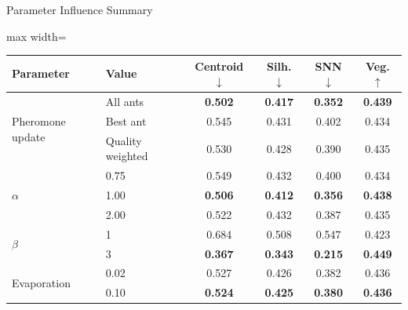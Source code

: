 \documentclass[aspectratio=169,10pt]{beamer}
\newcommand{\betterdown}{\(\downarrow\)}
\newcommand{\betterup}{\(\uparrow\)}
\begin{document}
\begin{frame}{Parameter Influence Summary}
  \begin{adjustbox}{max width=\textwidth}
  \begin{tabular}{llcccc}
    \toprule
    Parameter & Value & Centroid \betterdown & Silh. \betterdown & SNN \betterdown & Veg. \betterup \\
    \midrule
    \multirow{3}{*}{Pheromone update}
      & All ants & \textbf{0.502} & \textbf{0.417} & \textbf{0.352} & \textbf{0.439} \\
      & Best ant & 0.545 & 0.431 & 0.402 & 0.434 \\
      & Quality weighted & 0.530 & 0.428 & 0.390 & 0.435 \\
    \midrule
    \multirow{3}{*}{\(\alpha\)}
      & 0.75 & 0.549 & 0.432 & 0.400 & 0.434 \\
      & 1.00 & \textbf{0.506} & \textbf{0.412} & \textbf{0.356} & \textbf{0.438} \\
      & 2.00 & 0.522 & 0.432 & 0.387 & 0.435 \\
    \midrule
    \multirow{2}{*}{\(\beta\)}
      & 1 & 0.684 & 0.508 & 0.547 & 0.423 \\
      & 3 & \textbf{0.367} & \textbf{0.343} & \textbf{0.215} & \textbf{0.449} \\
    \midrule
    \multirow{2}{*}{Evaporation}
      & 0.02 & 0.527 & 0.426 & 0.382 & 0.436 \\
      & 0.10 & \textbf{0.524} & \textbf{0.425} & \textbf{0.380} & \textbf{0.436} \\
    \bottomrule
  \end{tabular}
  \end{adjustbox}
\end{frame}
\end{document}
